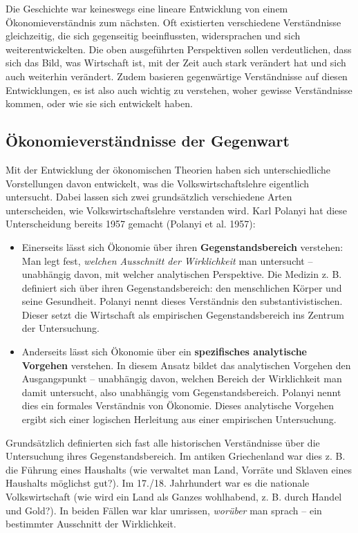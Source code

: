 \documentclass[
  nswissgerman,
  a4paper,
  DIV=11,
  numbers=noendperiod,
  oneside,
  openany]{scrreprt}
\begin{document}
Die Geschichte war keineswegs eine lineare Entwicklung von einem
Ökonomieverständnis zum nächsten. Oft existierten verschiedene
Verständnisse gleichzeitig, die sich gegenseitig beeinflussten,
widersprachen und sich weiterentwickelten. Die oben ausgeführten
Perspektiven sollen verdeutlichen, dass sich das Bild, was Wirtschaft
ist, mit der Zeit auch stark verändert hat und sich auch weiterhin
verändert. Zudem basieren gegenwärtige Verständnisse auf diesen
Entwicklungen, es ist also auch wichtig zu verstehen, woher gewisse
Verständnisse kommen, oder wie sie sich entwickelt haben.

\subsection{Ökonomieverständnisse der
Gegenwart}\label{uxf6konomieverstuxe4ndnisse-der-gegenwart}

Mit der Entwicklung der ökonomischen Theorien haben sich
unterschiedliche Vorstellungen davon entwickelt, was die
Volkswirtschaftslehre eigentlich untersucht. Dabei lassen sich zwei
grundsätzlich verschiedene Arten unterscheiden, wie
Volkswirtschaftslehre verstanden wird. Karl Polanyi hat diese
Unterscheidung bereits 1957 gemacht (Polanyi et al. 1957):

\begin{itemize}
\item
  Einerseits lässt sich Ökonomie über ihren \textbf{Gegenstandsbereich}
  verstehen: Man legt fest, \emph{welchen Ausschnitt der Wirklichkeit}
  man untersucht -- unabhängig davon, mit welcher analytischen
  Perspektive. Die Medizin z. B. definiert sich über ihren
  Gegenstandsbereich: den menschlichen Körper und seine Gesundheit.
  Polanyi nennt dieses Verständnis den substantivistischen. Dieser setzt
  die Wirtschaft als empirischen Gegenstandsbereich ins Zentrum der
  Untersuchung.
\item
  Anderseits lässt sich Ökonomie über ein \textbf{spezifisches
  analytische Vorgehen} verstehen. In diesem Ansatz bildet das
  analytischen Vorgehen den Ausgangspunkt -- unabhängig davon, welchen
  Bereich der Wirklichkeit man damit untersucht, also unabhängig vom
  Gegenstandsbereich. Polanyi nennt dies ein formales Verständnis von
  Ökonomie. Dieses analytische Vorgehen ergibt sich einer logischen
  Herleitung aus einer empirischen Untersuchung.
\end{itemize}

Grundsätzlich definierten sich fast alle historischen Verständnisse über
die Untersuchung ihres Gegenstandsbereich. Im antiken Griechenland war
dies z. B. die Führung eines Haushalts (wie verwaltet man Land, Vorräte
und Sklaven eines Haushalts möglichst gut?). Im 17./18. Jahrhundert war
es die nationale Volkswirtschaft (wie wird ein Land als Ganzes
wohlhabend, z. B. durch Handel und Gold?). In beiden Fällen war klar
umrissen, \emph{worüber} man sprach -- ein bestimmter Ausschnitt der
Wirklichkeit.
\end{document}
